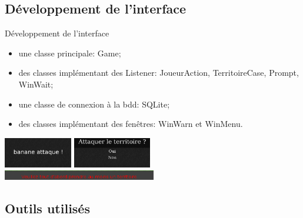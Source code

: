 \documentclass{beamer}
\begin{document}
	\subsection{Développement de l'interface}
	
\begin{frame}{Développement de l'interface}

	\begin{itemize}
		\item une classe principale: Game;
		\item des classes implémentant des Listener: JoueurAction, TerritoireCase, Prompt, WinWait;
		\item une classe de connexion à la bdd: SQLite;
		\item des classes implémentant des fenêtres: WinWarn et WinMenu.
	\end{itemize}
	
	\begin{center}
		\includegraphics[width=3cm]{winwait.png} \hspace*{0.2cm}
		\includegraphics[width=3.4cm]{winmenu.png}\\
		\vspace*{0.2cm}
		\includegraphics[width=6.7cm]{winwarn.png}
		
	\end{center}

\end{frame}

	\subsection{Outils utilisés}
\end{document}
